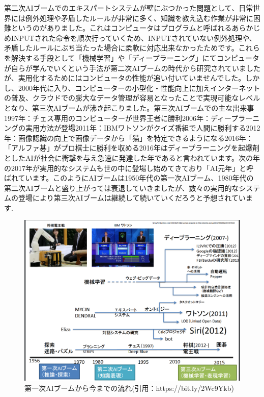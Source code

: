 第二次AIブームでのエキスパートシステムが壁にぶつかった問題として、日常世界には例外処理や矛盾したルールが非常に多く、知識を教え込む作業が非常に困難というのがありました。これはコンピュータはプログラムと呼ばれるあらかじめINPUTされた命令を順次行っていくため、INPUTされていない例外処理や、矛盾したルールにぶち当たった場合に柔軟に対応出来なかったためです。これらを解決する手段として「機械学習」や「ディープラーニング」にてコンピュータが自らが学んでいくという手法が第二次AIブームの時代から研究されていましたが、実用化するためにはコンピュータの性能が追い付いていませんでした。しかし、2000年代に入り、コンピューターの小型化・性能向上に加えインターネットの普及、クラウドでの膨大なデータ管理が容易となったことで実現可能なレベルとなり、第三次AIブームが沸き起こりました。第三次AIブームでの主な出来事1997年：チェス専用のコンピューターが世界王者に勝利2006年：ディープラーニングの実用方法が登場2011年：IBMワトソンがクイズ番組で人間に勝利する2012年：画像認識の向上で画像データから「猫」を特定できるようになる2016年：「アルファ碁」がプロ棋士に勝利を収める2016年はディープラーニングを起爆剤としたAIが社会に衝撃を与え急速に発達した年であると言われています。次の年の2017年が実用的なシステムも世の中に登場し始めてきており「AI元年」と呼ばれています。このようにAIブームは1950年代の第一次AIブーム、1980年代の第二次AIブームと盛り上がっては衰退していきましたが、数々の実用的なシステムの登場により第三次AIブームは継続して続いていくだろうと予想されています.\\
\begin{figure}[!ht]
    \begin{screen}
    \begin{center}
        \includegraphics[scale=0.4, clip]{./img/AI_History.png}
        \caption{第一次AIブームから今までの流れ\newline(引用：https://bit.ly/2Wc9Ykb)}
        \label{fig:第一次AIブームから今までの流れ}
    \end{center}
\end{screen}
\end{figure}\\
